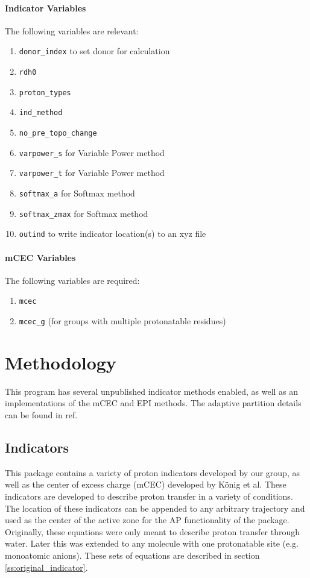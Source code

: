 \documentclass{article}
\begin{document}
\paragraph{Indicator Variables}
The following variables are relevant:
\begin{enumerate}
	\item \texttt{donor\_index} to set donor for calculation
	\item \texttt{rdh0}
	\item \texttt{proton\_types}
	\item \texttt{ind\_method}
	\item \texttt{no\_pre\_topo\_change}
	\item \texttt{varpower\_s} for Variable Power method
	\item \texttt{varpower\_t} for Variable Power method
	\item \texttt{softmax\_a} for Softmax method
	\item \texttt{softmax\_zmax} for Softmax method
	\item \texttt{outind} to write indicator location(s) to an xyz file
\end{enumerate}

\paragraph{mCEC Variables}
The following variables are required:
\begin{enumerate}
	\item \texttt{mcec}
	\item \texttt{mcec\_g} (for groups with multiple protonatable residues)
\end{enumerate}

\section{Methodology}
This program has several unpublished indicator methods enabled, as well as an implementations of the mCEC\cite{Konig2006} and EPI\cite{Watanabe2020} methods.
The adaptive partition details can be found in ref.\cite{Pezeshki2015}

\subsection{Indicators}
This package contains a variety of proton indicators developed by our group,\cite{Wu2013,Pezeshki2015} as well as the center of excess charge (mCEC) developed by K\"onig et al.\cite{Konig2006}
These indicators are developed to describe proton transfer in a variety of conditions.
The location of these indicators can be appended to any arbitrary trajectory and used as the center of the active zone for the AP functionality of the package.
Originally, these equations were only meant to describe proton transfer through water.\cite{Wu2013,Pezeshki2015}
Later this was extended to any molecule with one protonatable site (e.g. monoatomic anions).\cite{Garza2019}
These sets of equations are described in section \ref{ss:original_indicator}.
\end{document}
